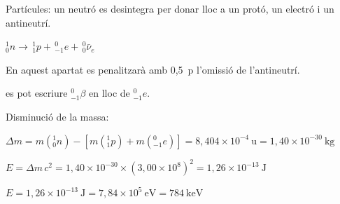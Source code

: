 \begin{solapartat}
 Partícules: un neutró es desintegra per donar lloc a un protó, un electró i un antineutrí.

 $^{1}_{0}n \rightarrow\, ^{1}_{1}p + \,^{0}_{-1}e + \,^{0}_{0}\bar{\nu}_e$

En aquest apartat es penalitzarà amb 0,5~p l'omissió de l'antineutrí.

 es pot escriure $^{0}_{-1}\beta$ en lloc de $^{0}_{-1}e$.
\end{solapartat}

\begin{solapartat}
Disminució de la massa:

 $\Delta m = m(^{1}_{0}n) - \left[m(^{1}_{1}p) + m(^{0}_{-1}e)\right] = 8,404\times 10^{-4}\ \mathrm{u} = 1,40\times 10^{-30}\ \mathrm{kg}$

 $E = \Delta m\,c^2 = 1,40\times 10^{-30}\times (3,00\times 10^{8})^2 = 1,26\times 10^{-13}\ \mathrm{J}$

 $E = 1,26\times 10^{-13}\ \mathrm{J} = 7,84\times 10^{5}\ \mathrm{eV} = 784\ \mathrm{keV}$
\end{solapartat}
